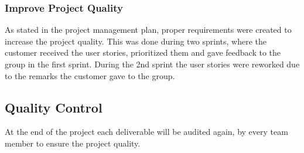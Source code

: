 \subsubsection{Improve Project Quality}
As stated in the project management plan, proper requirements were created to increase the project quality. This was done during two sprints, where the customer received the user stories, prioritized them and gave feedback to the group in the first sprint. During the 2nd sprint the user stories were reworked due to the remarks the customer gave to the group.

\subsection{Quality Control}
At the end of the project each deliverable will be audited again, by every team member to ensure the project quality.
